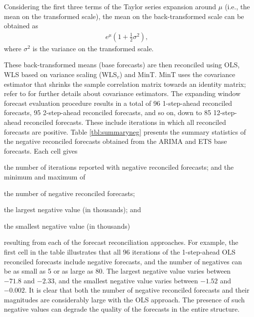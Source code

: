 \documentclass[11pt]{article}
\newcommand{\0}{\phantom{0}}
\begin{document}
Considering the first three terms of the Taylor series expansion around $\mu$ (i.e., the mean on the transformed scale), the mean on the back-transformed scale can be obtained as
\begin{align*}
e^{\mu}\left(1 + \frac{1}{2}\sigma^{2}\right),
\end{align*} 
where $\sigma^{2}$ is the variance on the transformed scale.

These back-transformed means (base forecasts) are then reconciled using OLS, WLS based on variance scaling (WLS$_{v}$) and MinT. MinT uses the covariance estimator that shrinks the sample correlation matrix towards an identity matrix; refer to \citet{Wick2018} for further details about covariance estimators. The expanding window forecast evaluation procedure results in a total of 96 1-step-ahead reconciled forecasts, 95 2-step-ahead reconciled forecasts, and so on, down to 85 12-step-ahead reconciled forecasts. These include iterations in which all reconciled forecasts are positive. Table \ref{tbl:summaryneg} presents the summary statistics of the negative reconciled forecasts obtained from the ARIMA and ETS base forecasts. Each cell gives \begin{inparaenum}[(i)] \item the number of iterations reported with negative reconciled forecasts; and the minimum and maximum of \item the number of negative reconciled forecasts; \item the largest negative value (in thousands); and \item the smallest negative value (in thousands) \end{inparaenum} resulting from each of the forecast reconciliation approaches. For example, the first cell in the table illustrates that all 96 iterations of the 1-step-ahead OLS reconciled forecasts include negative forecasts, and the number of negatives can be as small as 5 or as large as 80. The largest negative value varies between $-71.8$ and $-2.33$, and the smallest negative value varies between $-1.52$ and $-0.002$. It is clear that both the number of negative reconciled forecasts and their magnitudes are considerably large with the OLS approach. The presence of such negative values can degrade the quality of the forecasts in the entire structure.
\end{document}
